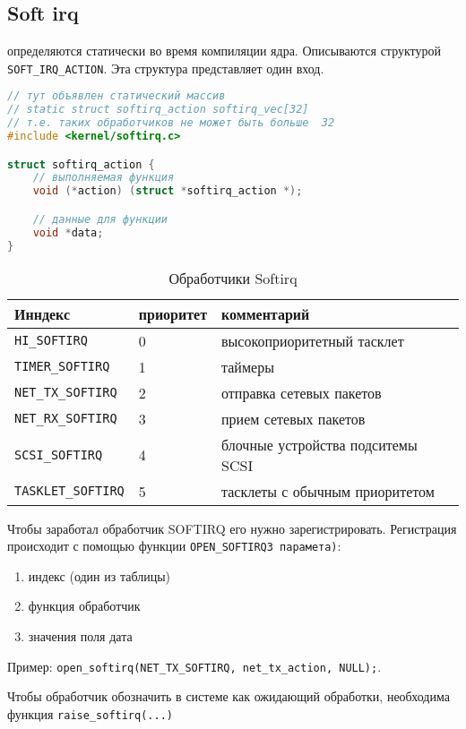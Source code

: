 \subsection{Soft irq}
определяются статически во время компиляции ядра. Описываются структурой \verb|SOFT_IRQ_ACTION|. Эта структура представляет один вход.

\begin{lstlisting}[language=c]
// тут объявлен статический массив 
// static struct softirq_action softirq_vec[32]
// т.е. таких обработчиков не может быть больше  32
#include <kernel/softirq.c>

struct softirq_action {
	// выполняемая функция
	void (*action) (struct *softirq_action *);

	// данные для функции
	void *data; 
}
\end{lstlisting}

\begin{table}[H]
\caption{Обработчики Softirq}
\begin{tabular}{|l|l|l|}
\hline
Инндекс & приоритет &  комментарий\\
\hline
\verb|HI_SOFTIRQ| & 0 & высокоприоритетный тасклет \\
\verb|TIMER_SOFTIRQ|  & 1 & таймеры\\
\verb|NET_TX_SOFTIRQ| &  2 & отправка сетевых пакетов\\
\verb|NET_RX_SOFTIRQ| &  3 & прием сетевых пакетов\\
\verb|SCSI_SOFTIRQ| &  4 & блочные устройства подситемы SCSI\\
\verb|TASKLET_SOFTIRQ| & 5 & тасклеты с обычным приоритетом \\
\hline
\end{tabular}
\end{table}

Чтобы заработал обработчик SOFTIRQ его нужно зарегистрировать. Регистрация происходит с помощью функции \verb|OPEN_SOFTIRQ3 парамета)|:
\begin{enumerate}
	\item индекс (один из таблицы)
	\item функция обработчик
	\item значения поля дата 
\end{enumerate}

Пример: \verb|open_softirq(NET_TX_SOFTIRQ, net_tx_action, NULL);|.

Чтобы обработчик обозначить в системе как ожидающий обработки, необходима функция \verb|raise_softirq(...)|

